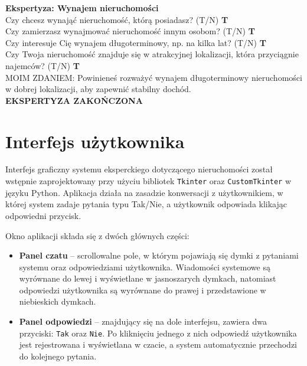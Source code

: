 \noindent \textbf{Ekspertyza: Wynajem nieruchomości}\\
\noindent Czy chcesz wynająć nieruchomość, którą posiadasz? (T/N) \textbf{T} \\
\noindent Czy zamierzasz wynajmować nieruchomość innym osobom? (T/N) \textbf{T} \\
\noindent Czy interesuje Cię wynajem długoterminowy, np. na kilka lat? (T/N) \textbf{T} \\
\noindent Czy Twoja nieruchomość znajduje się w atrakcyjnej lokalizacji, która przyciągnie najemców? (T/N) \textbf{T} \\
MOIM ZDANIEM: Powinieneś rozważyć wynajem długoterminowy nieruchomości w dobrej lokalizacji, aby zapewnić stabilny dochód.\\
\textbf{EKSPERTYZA ZAKOŃCZONA}\\

\section{Interfejs użytkownika}
Interfejs graficzny systemu eksperckiego dotyczącego nieruchomości został wstępnie zaprojektowany przy użyciu bibliotek \texttt{Tkinter} oraz \texttt{CustomTkinter} w języku Python. Aplikacja działa na zasadzie konwersacji z użytkownikiem, w której system zadaje pytania typu Tak/Nie, a użytkownik odpowiada klikając odpowiedni przycisk.

Okno aplikacji składa się z dwóch głównych części:
\begin{itemize}
    \item \textbf{Panel czatu} -- scrollowalne pole, w którym pojawiają się dymki z pytaniami systemu oraz odpowiedziami użytkownika. Wiadomości systemowe są wyrównane do lewej i wyświetlane w jasnoszarych dymkach, natomiast odpowiedzi użytkownika są wyrównane do prawej i przedstawione w niebieskich dymkach.
    \item \textbf{Panel odpowiedzi} -- znajdujący się na dole interfejsu, zawiera dwa przyciski: \texttt{Tak} oraz \texttt{Nie}. Po kliknięciu jednego z nich odpowiedź użytkownika jest rejestrowana i wyświetlana w czacie, a system automatycznie przechodzi do kolejnego pytania.
\end{itemize}

